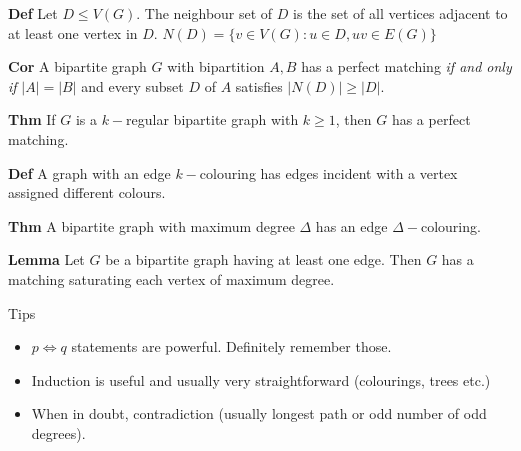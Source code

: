 \documentclass{article}
\begin{document}
\textbf{Def} Let $D \le V(G)$. The neighbour set of $D$ is the set of all vertices adjacent to at least one vertex in $D$. $N(D) = \{v \in V(G): u \in D, uv \in E(G)\}$

\textbf{Cor} A bipartite graph $G$ with bipartition $A,B$ has a perfect matching \textit{if and only if} $|A| = |B|$ and every subset $D$ of $A$ satisfies $|N(D)| \ge |D|$. 

\textbf{Thm} If $G$ is a $k-$regular bipartite graph with $k \ge 1$, then $G$ has a perfect matching. 

\textbf{Def} A graph with an edge $k-$colouring has edges incident with a vertex assigned different colours. 

\textbf{Thm} A bipartite graph with maximum degree $\Delta$ has an edge $\Delta-$colouring.

\textbf{Lemma} Let $G$ be a bipartite graph having at least one edge. Then $G$ has a matching saturating each vertex of maximum degree. 





\begin{center}
Tips
\end{center}

\begin{itemize}
    \item $p \iff q$ statements are powerful. Definitely remember those. 
    \item Induction is useful and usually very straightforward (colourings, trees etc.)
    \item When in doubt, contradiction (usually longest path or odd number of odd degrees). 
\end{itemize}
\end{document}

